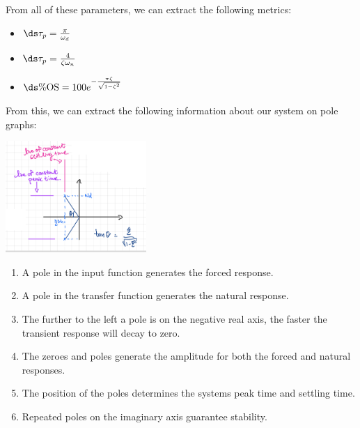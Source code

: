 \documentclass{article}
\begin{document}
From all of these parameters, we can extract the following metrics:
\begin{itemize}
\item {} $\ds \tau_p = \frac{\pi}{\omega_d}$
\item {} $\ds \tau_p = \frac{4}{\zeta \omega_n}$
\item {} $\ds \%\text{OS} = 100e^{-\frac{\pi \zeta}{\sqrt{1-\zeta^2}}}$
\end{itemize}
From this, we can extract the following information about our system on pole graphs:
\begin{center}
  \includegraphics[width=0.4\textwidth]{images/pole_times_drawing.png}
\end{center}

\gap
{}
\begin{enumerate}
\item A pole in the input function generates the forced response.
\item A pole in the transfer function generates the natural response.
\item The further to the left a pole is on the negative real axis, the faster the
  transient response will decay to zero.
\item The zeroes and poles generate the amplitude for both the forced and natural responses.
\item The position of the poles determines the systems peak time and settling time.
\item Repeated poles on the imaginary axis guarantee stability.
\end{enumerate}
\end{document}
